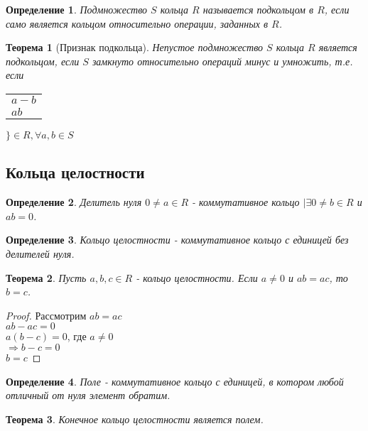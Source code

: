 \documentclass[10pt,a4paper]{article}
\newtheorem{definition}{Определение}
\newtheorem{theorem}{Теорема}
\begin{document}
			\begin{definition}
				Подмножество $S$ кольца $R$ называется подкольцом в $R$, если само является кольцом относительно операции, заданных в $R$.
			\end{definition}
			\begin{theorem}[Признак подкольца]
				Непустое подмножество $S$ кольца $R$ является подкольцом, если $S$ замкнуто относительно операций минус и умножить, т.е. если
				\begin{tabular}{l}
				$a-b$\\
				$ab$			
				\end{tabular}
				$\Big\} \in R, \forall a, b \in S$
			\end{theorem}
		\subsection{Кольца целостности}
			\begin{definition}
				Делитель нуля $0 \neq a \in R$ - коммутативное кольцо $\big| \exists 0 \neq b \in R $ и $ab = 0$.
			\end{definition}
			\begin{definition}
				Кольцо целостности - коммутативное кольцо с единицей без делителей нуля.
			\end{definition}
			\begin{theorem}
				Пусть $a, b, c \in R$ - кольцо целостности. Если $a \neq 0$ и $ab = ac$, то $b = c$.
			\end{theorem}
			\begin{proof}
				Рассмотрим $ab = ac$\\
				$ab - ac = 0$\\
				$a(b-c) = 0$, где $a \neq 0$\\
				$\Rightarrow b - c = 0$\\
				$b = c$
			\end{proof}
			\begin{definition}
				Поле - коммутативное кольцо с единицей, в котором любой отличный от нуля элемент обратим.
			\end{definition}
			\begin{theorem}
				Конечное кольцо целостности является полем.
			\end{theorem}
\end{document}
